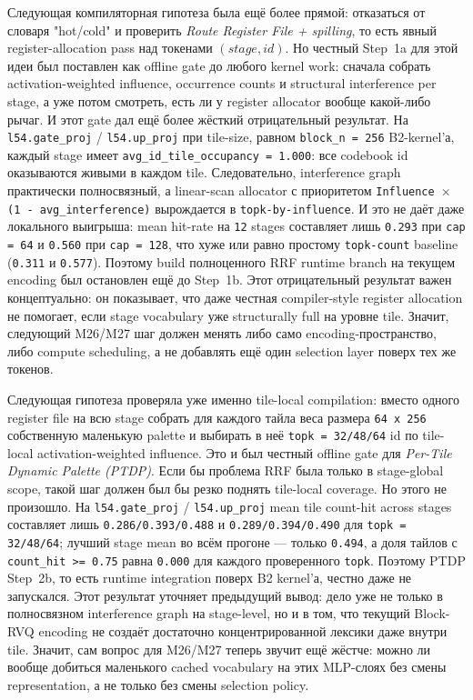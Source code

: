\begin{itemize}[leftmargin=1.5em]
Следующая компиляторная гипотеза была ещё более прямой: отказаться от словаря
"hot/cold" и проверить \emph{Route Register File + spilling}, то есть явный
register-allocation pass над токенами $(stage,id)$. Но честный Step~1a для
этой идеи был поставлен как offline gate до любого kernel work: сначала
собрать activation-weighted influence, occurrence counts и structural
interference per stage, а уже потом смотреть, есть ли у register allocator
вообще какой-либо рычаг. И этот gate дал ещё более жёсткий отрицательный
результат. На \texttt{l54.gate\_proj} / \texttt{l54.up\_proj} при tile-size,
равном \texttt{block\_n = 256} B2-kernel'а, каждый stage имеет
\texttt{avg\_id\_tile\_occupancy = 1.000}: все codebook id оказываются живыми
в каждом tile. Следовательно, interference graph практически полносвязный, а
linear-scan allocator с приоритетом
\texttt{Influence $\times$ (1 - avg\_interference)} вырождается в
\texttt{topk-by-influence}. И это не даёт даже локального выигрыша: mean
hit-rate на \texttt{12} stages составляет лишь \texttt{0.293} при
\texttt{cap = 64} и \texttt{0.560} при \texttt{cap = 128}, что хуже или равно
простому \texttt{topk-count} baseline (\texttt{0.311} и \texttt{0.577}).
Поэтому build полноценного RRF runtime branch на текущем encoding был
остановлен ещё до Step~1b. Этот отрицательный результат важен концептуально:
он показывает, что даже честная compiler-style register allocation не помогает,
если stage vocabulary уже structurally full на уровне tile. Значит, следующий
M26/M27 шаг должен менять либо само encoding-пространство, либо compute
scheduling, а не добавлять ещё один selection layer поверх тех же токенов.

Следующая гипотеза проверяла уже именно tile-local compilation: вместо одного
register file на всю stage собрать для каждого тайла веса размера
\texttt{64 x 256} собственную маленькую palette и выбирать в неё
\texttt{topk = 32/48/64} id по tile-local activation-weighted influence.
Это и был честный offline gate для \emph{Per-Tile Dynamic Palette (PTDP)}.
Если бы проблема RRF была только в stage-global scope, такой шаг должен был бы
резко поднять tile-local coverage. Но этого не произошло. На
\texttt{l54.gate\_proj} / \texttt{l54.up\_proj} mean tile count-hit across
stages составляет лишь \texttt{0.286/0.393/0.488} и
\texttt{0.289/0.394/0.490} для \texttt{topk = 32/48/64}; лучший stage mean во
всём прогоне --- только \texttt{0.494}, а доля тайлов с
\texttt{count\_hit >= 0.75} равна \texttt{0.000} для каждого проверенного
\texttt{topk}. Поэтому PTDP Step~2b, то есть runtime integration поверх B2
kernel'а, честно даже не запускался. Этот результат уточняет предыдущий вывод:
дело уже не только в полносвязном interference graph на stage-level, но и в
том, что текущий Block-RVQ encoding не создаёт достаточно концентрированной
лексики даже внутри tile. Значит, сам вопрос для M26/M27 теперь звучит ещё
жёстче: можно ли вообще добиться маленького cached vocabulary на этих MLP-слоях
без смены representation, а не только без смены selection policy.


\end{itemize}
